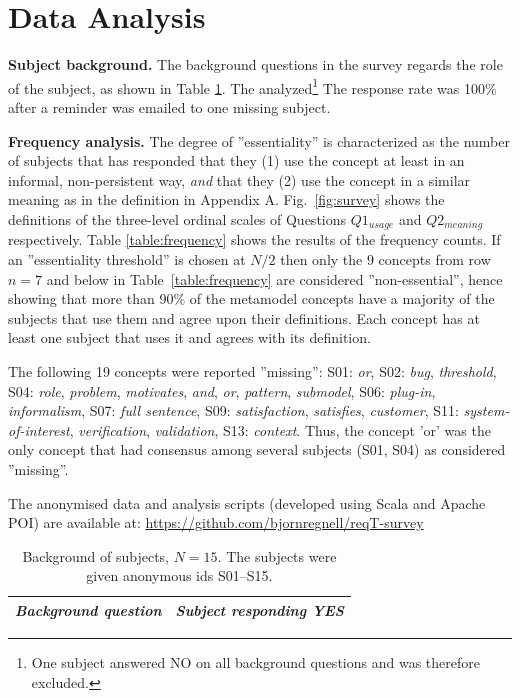 \documentclass[a4paper]{llncs}
\begin{document}
\section{Data Analysis}

\textbf{Subject background.} The background questions in the survey regards the role of the subject, as shown in Table \ref{table:background}. The analyzed\footnote{One subject answered NO on all background questions and was therefore excluded.}  The response rate was 100\% after a reminder was emailed to one missing subject. %

\textbf{Frequency analysis.} The degree of ''essentiality'' is characterized as the number of subjects that has responded that they (1) use the concept at least in an informal, non-persistent way, \textit{and} that they (2) use the concept in a similar meaning as in the definition in Appendix A. Fig.~\ref{fig:survey} shows the definitions of the three-level ordinal scales of Questions $Q1_{usage}$  and $Q2_{meaning}$ respectively. Table \ref{table:frequency} shows the results of the frequency counts.  
If an ''essentiality threshold'' is chosen at $N/2$ then only the $9$ concepts from row $n = 7$ and below in Table~\ref{table:frequency} are considered ''non-essential'', hence showing that more than 90\% of the metamodel concepts have a majority of the subjects that use them and agree upon their definitions. Each concept has at least one subject that uses it and agrees with its definition. 

The following 19 concepts were reported ''missing'': 
S01: \emph{or}, 
S02: \emph{bug}, \emph{threshold},
S04: \emph{role}, \emph{problem}, \emph{motivates}, \emph{and}, \emph{or}, \emph{pattern}, \emph{submodel},
S06: \emph{plug-in}, \emph{informalism}, 
S07: \emph{full sentence}, 
S09: \emph{satisfaction}, \emph{satisfies}, \emph{customer},
S11: \emph{system-of-interest}, \emph{verification}, \emph{validation}, S13: \emph{context}. 
Thus, the  concept 'or' was the only concept that had consensus among several subjects (S01, S04) as considered ''missing''. 

{The anonymised data and analysis scripts (developed using Scala and Apache POI) are available at: \footnotesize\url{https://github.com/bjornregnell/reqT-survey}} 
\vspace{-0.3cm}

\begingroup
\begin{table}[H]
\setlength{\tabcolsep}{4pt} %
\renewcommand{\arraystretch}{1.4} %
\centering
\fontsize{8.5}{9}\selectfont
\caption{Background of subjects, $N = 15$. The subjects were given anonymous ids S01--S15.}
\label{table:background}
\vspace{-0.2cm}
\begin{tabular}{p{}| p{}}
\textit{Background question} & \textit{Subject responding YES}  \\ \hline

 \end{tabular}
\end{table}
\endgroup
\end{document}
